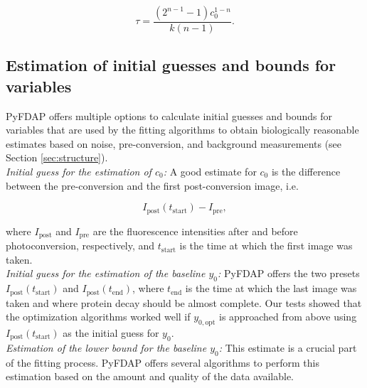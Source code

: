 \documentclass[a4paper,11pt]{article}
\begin{document}
\begin{equation*}
\tau=\frac{(2^{n-1}-1) c_0^{1-n}}{k(n-1)}.
\end{equation*}

\subsection{Estimation of initial guesses and bounds for variables}
\label{sec:bounds}
PyFDAP offers multiple options to calculate initial guesses and bounds for variables that are used by the fitting algorithms to obtain biologically reasonable estimates based on noise, pre-conversion, and background measurements (see Section \ref{sec:structure}).\\ 

\noindent \textit{Initial guess for the estimation of $c_0$:} A good estimate for $c_0$ is the difference between the pre-conversion and the first post-conversion image, i.e.

\begin{equation*}
 I_{\mathrm{post}}(t_{\mathrm{start}})-I_{\mathrm{pre}},
\end{equation*}

\noindent where $I_{\mathrm{post}}$ and $I_{\mathrm{pre}}$ are the fluorescence intensities after and before photoconversion, respectively, and $t_{\mathrm{start}}$ is the time at which the first image was taken. \\

\noindent \textit{Initial guess for the estimation of the baseline $y_0$:} PyFDAP offers the two presets $I_{\mathrm{post}}(t_{\mathrm{start}})$ and $I_{\mathrm{post}}(t_{\mathrm{end}})$, where $t_{\mathrm{end}}$ is the time at which the last image was taken and where protein decay should be almost complete. Our tests showed that the optimization algorithms worked well if $y_{0,\mathrm{opt}}$ is approached from above using $I_{\mathrm{post}}(t_{\mathrm{start}})$ as the initial guess for $y_0$.\\

\noindent \textit{Estimation of the lower bound for the baseline $y_0$:} This estimate is a crucial part of the fitting process. PyFDAP offers several algorithms to perform this estimation based on the amount and quality of the data available. 
\end{document}
